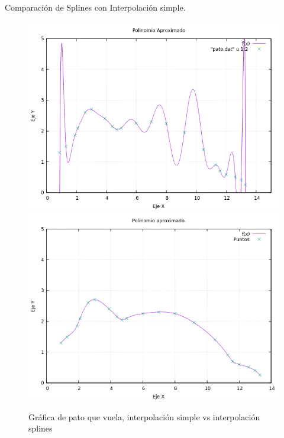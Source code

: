 \documentclass[12pt]{beamer}
\begin{document}
\begin{frame}{Comparación de Splines con Interpolación simple.}

\begin{figure}[H]
\centering
\includegraphics[scale=0.3]{patointer.png} 
\includegraphics[scale=0.3]{graficapatosplines.png} 
\caption{Gráfica de pato que vuela, interpolación simple vs interpolación splines}
\end{figure}

\end{frame}
\end{document}
